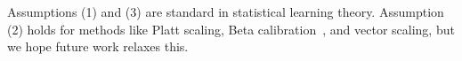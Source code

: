 Assumptions (1) and (3) are standard in statistical learning theory. Assumption (2) holds for methods like Platt scaling, Beta calibration~\cite{kull2017sigmoids}, and vector scaling, but we hope future work relaxes this.








